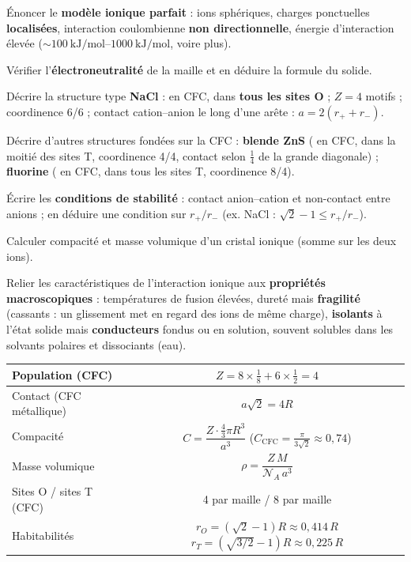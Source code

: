 \documentclass[11pt,a4paper]{article}
\begin{document}
\begin{savoir}
  \item Énoncer le \textbf{modèle ionique parfait} : ions sphériques, charges ponctuelles
        \textbf{localisées}, interaction coulombienne \textbf{non directionnelle},
        énergie d'interaction élevée ($\sim\SIrange{100}{1000}{\kilo\joule\per\mol}$, voire plus).
  \item Vérifier l'\textbf{électroneutralité} de la maille et en déduire la formule du solide.
  \item Décrire la structure type \textbf{NaCl} :  en CFC,  dans
        \textbf{tous les sites O} ; $Z=4$ motifs  ; coordinence 6/6 ; contact
        cation--anion le long d'une arête : $a = 2(r_+ + r_-)$.
  \item Décrire d'autres structures fondées sur la CFC : \textbf{blende ZnS} ( en CFC,
         dans la moitié des sites T, coordinence 4/4, contact selon
        $\frac14$ de la grande diagonale) ; \textbf{fluorine } ( en CFC,
         dans tous les sites T, coordinence 8/4).
  \item Écrire les \textbf{conditions de stabilité} : contact anion--cation et non-contact entre
        anions ; en déduire une condition sur $r_+/r_-$ (ex. NaCl :
        $\sqrt2-1 \le r_+/r_-$).
  \item Calculer compacité et masse volumique d'un cristal ionique (somme sur les deux ions).
  \item Relier les caractéristiques de l'interaction ionique aux \textbf{propriétés macroscopiques} :
        températures de fusion élevées, dureté mais \textbf{fragilité} (cassants : un glissement
        met en regard des ions de même charge), \textbf{isolants} à l'état solide mais
        \textbf{conducteurs} fondus ou en solution, souvent solubles dans les solvants polaires
        et dissociants (eau).
\end{savoir}

\begin{formules}
\begin{center}
\renewcommand{\arraystretch}{1.5}
\begin{tabular}{|l|c|}
\hline
Population (CFC) & $Z = 8\times\frac18 + 6\times\frac12 = 4$ \\ \hline
Contact (CFC métallique) & $a\sqrt2 = 4R$ \\ \hline
Compacité & $C = \dfrac{Z\cdot\frac43\pi R^3}{a^3}$ \quad ($C_{\mathrm{CFC}} = \frac{\pi}{3\sqrt2}\approx 0{,}74$) \\ \hline
Masse volumique & $\rho = \dfrac{Z\,M}{\mathcal N_A\,a^3}$ \\ \hline
Sites O / sites T (CFC) & 4 par maille / 8 par maille \\ \hline
Habitabilités & $r_O = (\sqrt2-1)R\approx0{,}414\,R$ \quad $r_T=(\sqrt{3/2}-1)R\approx0{,}225\,R$ \\ \hline
\end{tabular}
\end{center}
\end{formules}
\end{document}
